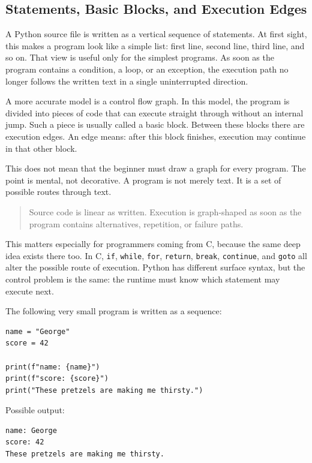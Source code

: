 \subsection{Statements, Basic Blocks, and Execution Edges}

A Python source file is written as a vertical sequence of statements. At first sight, this makes a program look like a simple list: first line, second line, third line, and so on. That view is useful only for the simplest programs. As soon as the program contains a condition, a loop, or an exception, the execution path no longer follows the written text in a single uninterrupted direction.

A more accurate model is a control flow graph. In this model, the program is divided into pieces of code that can execute straight through without an internal jump. Such a piece is usually called a basic block. Between these blocks there are execution edges. An edge means: after this block finishes, execution may continue in that other block.

This does not mean that the beginner must draw a graph for every program. The point is mental, not decorative. A program is not merely text. It is a set of possible routes through text.

\begin{quote}
Source code is linear as written. Execution is graph-shaped as soon as the program contains alternatives, repetition, or failure paths.
\end{quote}

This matters especially for programmers coming from C, because the same deep idea exists there too. In C, \texttt{if}, \texttt{while}, \texttt{for}, \texttt{return}, \texttt{break}, \texttt{continue}, and \texttt{goto} all alter the possible route of execution. Python has different surface syntax, but the control problem is the same: the runtime must know which statement may execute next.

The following very small program is written as a sequence:

\begin{verbatim}
name = "George"
score = 42

print(f"name: {name}")
print(f"score: {score}")
print("These pretzels are making me thirsty.")
\end{verbatim}

Possible output:

\begin{verbatim}
name: George
score: 42
These pretzels are making me thirsty.
\end{verbatim}


